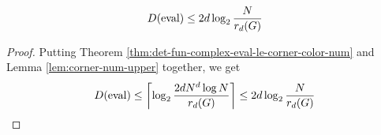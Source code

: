 \begin{corollary}
  \label{cor:det-fun-complex-eval-le-corner-free-num}

  $$D(\operatorname{eval}) \le 2d\log_2\frac N{r_d(G)}$$ %
\end{corollary}
\begin{proof}

  Putting Theorem \ref{thm:det-fun-complex-eval-le-corner-color-num} and Lemma \ref{lem:corner-num-upper} together, we get
  $$D(\operatorname{eval}) \le \left\lceil \log_2\frac{2dN^d\log N}{r_d(G)}\right\rceil \le 2d\log_2\frac N{r_d(G)}$$
\end{proof}
